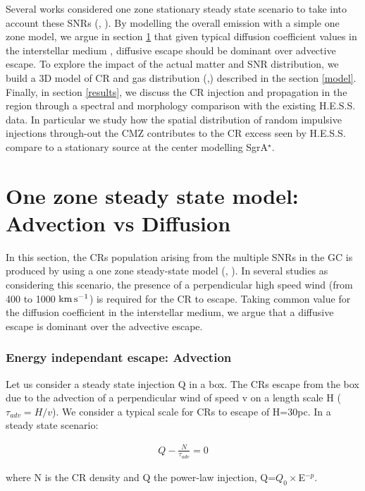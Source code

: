 \documentclass[a4paper,fleqn,usenatbib]{mnras}
\begin{document}
Several works considered one zone stationary steady state scenario to take into account these SNRs (\citet{2014ApJ...790...86Y}, \citet{2014arXiv1410.1678M}). By modelling the overall emission with a simple one zone model, we argue in section \ref{section1} that given typical diffusion coefficient values in the interstellar medium \citep{1990acr..book.....B}, diffusive escape should be dominant over advective escape. To explore the impact of the actual matter and SNR distribution, we build a 3D model of CR and gas distribution (\citep{2004MNRAS.349.1167S},\citep{2007A&A...467..611F}) described in the section \ref{model}. Finally, in section \ref{results}, we discuss the CR injection and propagation in the region through a spectral and morphology comparison with the existing H.E.S.S. data. In particular we study how the spatial distribution of random impulsive injections through-out the CMZ contributes to the CR excess seen by H.E.S.S. compare to a stationary source at the center modelling SgrA$^\star$.


% 
\section{One zone steady state model: Advection vs Diffusion}
\label{section1}
In this section, the CRs population arising from the multiple SNRs in the GC is produced by using a one zone steady-state model (\citet{2014ApJ...790...86Y}, \citet{2011MNRAS.413..763C}). In several studies as \citet{2011MNRAS.413..763C} considering this scenario, the presence of a perpendicular high speed wind (from 400 to 1000 $\rm km \, s^{-1}$) is required for the CR to escape. Taking common value for the diffusion coefficient in the interstellar medium, we argue that a diffusive escape is dominant over the advective escape.

\subsubsection{Energy independant escape: Advection}
\label{advection}
Let us consider a steady state injection Q in a box. The CRs escape from the box due to the advection of a perpendicular wind of speed v on a length scale H ($\tau_{adv}=H/v$). We consider a typical scale for CRs to escape of H=30pc. In a steady state scenario:
\begin{center}
\begin{eqnarray}
Q-\frac{N}{\tau_{adv}}=0
\label{steadystate}
\end{eqnarray}
\end{center} 
where N is the CR density and Q the power-law injection, Q=$Q_0\times$E$^{-p}$.
\end{document}
